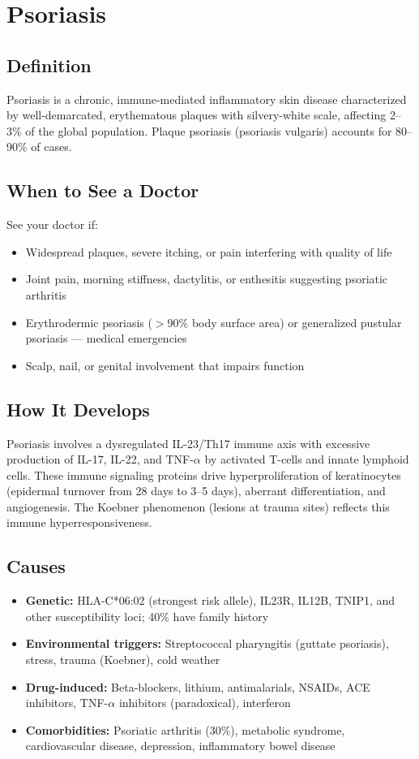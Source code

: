 \chapter{Psoriasis}

\section*{Definition}
Psoriasis is a chronic, immune-mediated inflammatory skin disease characterized by well-demarcated, erythematous plaques with silvery-white scale, affecting 2--3\% of the global population. Plaque psoriasis (psoriasis vulgaris) accounts for 80--90\% of cases.

\section*{When to See a Doctor}
See your doctor if:
\begin{itemize}
  \item Widespread plaques, severe itching, or pain interfering with quality of life
  \item Joint pain, morning stiffness, dactylitis, or enthesitis suggesting psoriatic arthritis
  \item Erythrodermic psoriasis (\ensuremath{>}90\% body surface area) or generalized pustular psoriasis --- medical emergencies
  \item Scalp, nail, or genital involvement that impairs function
\end{itemize}

\section*{How It Develops}
Psoriasis involves a dysregulated IL-23/Th17 immune axis with excessive production of IL-17, IL-22, and TNF-\ensuremath{\alpha} by activated T-cells and innate lymphoid cells. These immune signaling proteins drive hyperproliferation of keratinocytes (epidermal turnover from 28 days to 3--5 days), aberrant differentiation, and angiogenesis. The Koebner phenomenon (lesions at trauma sites) reflects this immune hyperresponsiveness.

\section*{Causes}
\begin{itemize}
  \item \textbf{Genetic:} HLA-C*06:02 (strongest risk allele), IL23R, IL12B, TNIP1, and other susceptibility loci; 40\% have family history
  \item \textbf{Environmental triggers:} Streptococcal pharyngitis (guttate psoriasis), stress, trauma (Koebner), cold weather
  \item \textbf{Drug-induced:} Beta-blockers, lithium, antimalarials, NSAIDs, ACE inhibitors, TNF-\ensuremath{\alpha} inhibitors (paradoxical), interferon
  \item \textbf{Comorbidities:} Psoriatic arthritis (30\%), metabolic syndrome, cardiovascular disease, depression, inflammatory bowel disease
\end{itemize}

